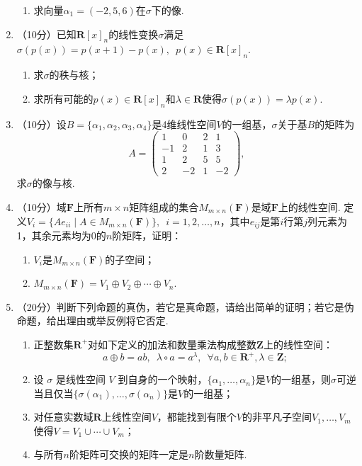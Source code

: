 \begin{enumerate}
\begin{enumerate}
        \item 求向量$\alpha_1=(-2,5,6)$在$\sigma$下的像.
    \end{enumerate}

    \item （10分）已知$\mathbf{R}[x]_n$的线性变换$\sigma$满足$\sigma(p(x))=p(x+1)-p(x),\enspace p(x)\in\mathbf{R}[x]_n$.
    \begin{enumerate}
        \item 求$\sigma$的秩与核；

        \item 求所有可能的$p(x)\in\mathbf{R}[x]_n$和$\lambda\in\mathbf{R}$使得$\sigma(p(x))=\lambda p(x)$.
    \end{enumerate}

    \item （10分）设$B=\{\alpha_1,\alpha_2,\alpha_3,\alpha_4\}$是4维线性空间$V$的一组基，$\sigma$关于基$B$的矩阵为
    \[A=\begin{pmatrix}1 & 0 & 2 & 1 \\ -1 & 2 & 1 & 3 \\ 1 & 2 & 5 & 5 \\ 2 & -2 & 1 & -2\end{pmatrix},\]
    求$\sigma$的像与核.

    \item （10分）域$\mathbf{F}$上所有$m\times n$矩阵组成的集合$M_{m\times n}(\mathbf{F})$是域$\mathbf{F}$上的线性空间. 定义$V_i=\{Ae_{ii}\mid A\in M_{m\times n}(\mathbf{F})\}, \enspace i=1,2,\ldots,n$，其中$e_{ij}$是第$i$行第$j$列元素为1，其余元素均为0的$n$阶矩阵，证明：
    \begin{enumerate}
        \item $V_i$是$M_{m\times n}(\mathbf{F})$的子空间；

        \item $M_{m\times n}(\mathbf{F})=V_1\oplus V_2\oplus\cdots\oplus V_n$.
    \end{enumerate}

    \item （20分）判断下列命题的真伪，若它是真命题，请给出简单的证明；若它是伪命题，给出理由或举反例将它否定.
    \begin{enumerate}
        \item 正整数集$\mathbf{R}^+$对如下定义的加法和数量乘法构成整数$\mathbf{Z}$上的线性空间：
        \[a\oplus b=ab,\enspace\lambda\circ a=a^\lambda,\enspace\forall a,b\in\mathbf{R}^+,\lambda\in\mathbf{Z};\]

        \item 设 $\sigma$ 是线性空间 $V$ 到自身的一个映射，$\{\alpha_1,\ldots,\alpha_n\}$是$V$的一组基，则$\sigma$可逆当且仅当$\{\sigma(\alpha_1),\ldots,\sigma(\alpha_n)\}$是$V$的一组基；

        \item 对任意实数域$\mathbf{R}$上线性空间$V$，都能找到有限个$V$的非平凡子空间$V_1,\ldots,V_m$使得$V = V_1\cup\cdots\cup V_m$；

        \item 与所有$n$阶矩阵可交换的矩阵一定是$n$阶数量矩阵.
    \end{enumerate}
\end{enumerate}

\clearpage
